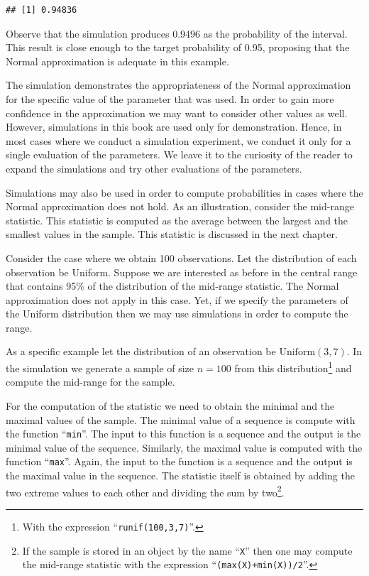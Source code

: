 \documentclass[]{krantz}
\theoremstyle{definition}
\theoremstyle{definition}
\theoremstyle{definition}
\theoremstyle{remark}
\begin{document}
\begin{verbatim}
## [1] 0.94836
\end{verbatim}

Observe that the simulation produces 0.9496 as the probability of the
interval. This result is close enough to the target probability of 0.95,
proposing that the Normal approximation is adequate in this example.

The simulation demonstrates the appropriateness of the Normal
approximation for the specific value of the parameter that was used. In
order to gain more confidence in the approximation we may want to
consider other values as well. However, simulations in this book are
used only for demonstration. Hence, in most cases where we conduct a
simulation experiment, we conduct it only for a single evaluation of the
parameters. We leave it to the curiosity of the reader to expand the
simulations and try other evaluations of the parameters.

Simulations may also be used in order to compute probabilities in cases
where the Normal approximation does not hold. As an illustration,
consider the mid-range statistic. This statistic is computed as the
average between the largest and the smallest values in the sample. This
statistic is discussed in the next chapter.

Consider the case where we obtain 100 observations. Let the distribution
of each observation be Uniform. Suppose we are interested as before in
the central range that contains 95\% of the distribution of the
mid-range statistic. The Normal approximation does not apply in this
case. Yet, if we specify the parameters of the Uniform distribution then
we may use simulations in order to compute the range.

As a specific example let the distribution of an observation be
\(\mathrm{Uniform}(3,7)\). In the simulation we generate a sample of
size \(n=100\) from this distribution\footnote{With the expression
  ``\texttt{runif(100,3,7)}''.} and compute the mid-range for the
sample.

For the computation of the statistic we need to obtain the minimal and
the maximal values of the sample. The minimal value of a sequence is
compute with the function ``\texttt{min}''. The input to this function
is a sequence and the output is the minimal value of the sequence.
Similarly, the maximal value is computed with the function
``\texttt{max}''. Again, the input to the function is a sequence and the
output is the maximal value in the sequence. The statistic itself is
obtained by adding the two extreme values to each other and dividing the
sum by two\footnote{If the sample is stored in an object by the name
  ``\texttt{X}'' then one may compute the mid-range statistic with the
  expression ``\texttt{(max(X)+min(X))/2}''.}.
\end{document}
